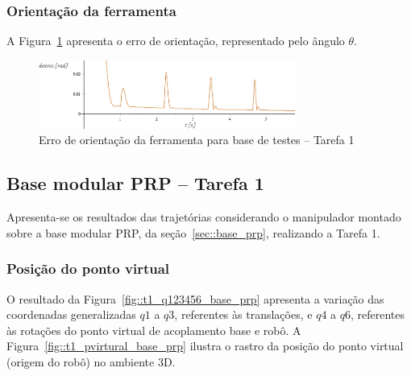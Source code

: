 \subsubsection{Orientação da ferramenta}

A Figura~\ref{fig::t1_erroori_base_testes} apresenta o erro de orientação,
representado pelo ângulo $\theta$.

\begin{figure}[h!]
	\centering 
 	\includegraphics[width=0.75\textwidth]{figs/t1_erroori_base_testes}
 	\caption{Erro de orientação da ferramenta para base de testes -- Tarefa
 	1}
 	\label{fig::t1_erroori_base_testes}
\end{figure}

\clearpage
\subsection{Base modular PRP -- Tarefa 1} \label{sec::res_prp}

Apresenta-se os resultados das trajetórias considerando o manipulador montado
sobre a base modular PRP, da seção~\ref{sec::base_prp}, realizando a Tarefa 1.

\subsubsection{Posição do ponto virtual}

O resultado da Figura~\ref{fig::t1_q123456_base_prp} apresenta a variação das
coordenadas generalizadas $q1$ a $q3$, referentes às translações, e $q4$ a $q6$,
referentes às rotações do ponto virtual de acoplamento base e robô. A
Figura~\ref{fig::t1_pvirtural_base_prp} ilustra o rastro da posição do ponto
virtual (origem do robô) no ambiente 3D.

